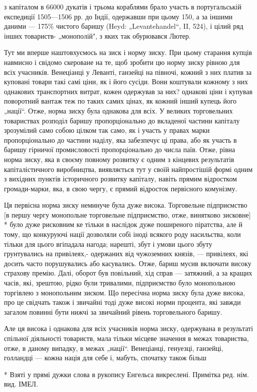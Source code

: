 \parcont{}  %
з капіталом в 66000 дукатів і трьома кораблями брало участь в португальській експедиції 1505—1506 рр. до Індії, одержавши
при цьому 150, а за іншими даними — 175\% чистого баришу (Heyd: „Levantehandel“, II, 524), і цілий ряд інших товариств-
„монополій", з яких так обурювався Лютер.

Тут ми вперше наштовхуємось на зиск і норму зиску. При цьому старання купців
навмисно і свідомо скероване на те, щоб зробити цю норму зиску рівною для всіх учасників. Венеціанці у Леванті, ганзейці на
півночі, кожний з них платив за куповані товари такі самі ціни, як і його сусіди. Вони коштували кожному з них однакових
транспортних витрат, кожен одержував за них? однакові ціни і купував поворотний вантаж теж по таких самих цінах, як кожний
інший купець його „нації“. Отже, норма зиску була однакова для всіх. У великих торговельних товариствах розподіл баришу
пропорціонально до вкладеної частини капіталу зрозумілий само собою цілком так само, як і участь у правах марки
пропорціонально до частини наділу, яка забезпечує ці права, або як участь в баришу гірничої промисловості пропорціонально
до числа паїв. Отже, рівна норма зиску, яка в своєму повному розвитку є одним з кінцевих результатів капіталістичного
виробництва, виявляється тут у своїй найпростішій формі одним з вихідних пунктів історичного розвитку капіталу, навіть
прямим відростком громади-марки, яка, в свою чергу, є прямий відросток первісного комунізму.

Ця первісна норма зиску
неминуче була дуже висока. Торговельне підприємство [в першу чергу монопольне торговельне підприємство, отже, винятково
зисковне] * було дуже рисковним ке тільки в наслідок дуже поширеного піратства, але й тому, що конкуруючі нації дозволяли
собі іноді всякого роду насильства, коли тільки для цього вгіпадала нагода; нарешті, збут і умови цього збуту грунтувались
на привілеях,-  одержаних від чужоземних князів, — привілеях, які досить часто порушувались або касувались. Отже, бариш
мусив включати високу страхову премію. Далі, оборот був повільний, хід справ — затяжний, а за кращих часів, які, зрештою,
рідко були тривалими, підприємство було монопольною торгівлею з монопольним зиском. Що пересічна норма зиску була дуже
висока, про це свідчать також і звичайні тоді дуже високі норми процента, які завжди загалом повинні бути нижчі за
звичайний рівень торговельного баришу.

Але ця висока і однакова для всіх учасників норма зиску, одержувана в результаті
спільної діяльності товариств, мала тільки місцеве значення в межах товариства, отже, в даному випадку, в межах „нації“.
Венеціанці, генуезці, ганзейці, голландці — кожна нація для себе і, мабуть, спочатку також більш

* Взяті у прямі дужки слова в рукопису Енгельса викреслені. Примітка ред. нім. вид. ІМЕЛ.
\parbreak{}  %
